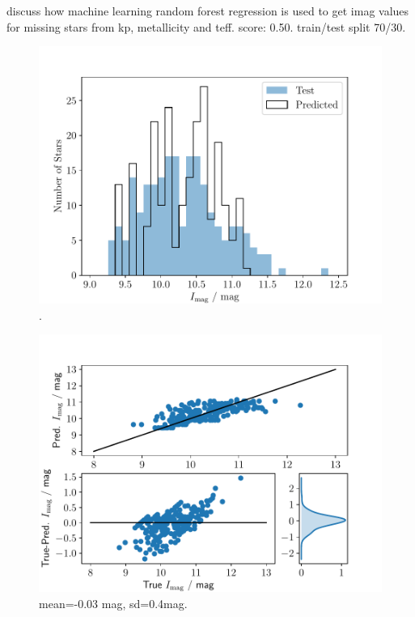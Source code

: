 \documentclass[a4paper,fleqn,usenatbib,useAMS]{mnras}
\begin{document}
discuss how machine learning random forest regression is used to get imag values for missing stars from kp, metallicity and teff. score: 0.50. train/test split 70/30.
\begin{figure}
	\centering
	\includegraphics[scale=0.5]{Plot3_Imag_tested_distribution}
	\caption{.}	
	\label{fig:imag test}
\end{figure}
\begin{figure}
	\centering
	\includegraphics[scale=0.5]{Plot4_Imag_scatter}
	\caption{mean=-0.03 mag, sd=0.4mag.}	
	\label{fig:imag test}
\end{figure}
\end{document}

